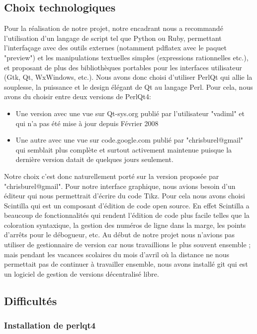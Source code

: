 \documentclass[a4paper]{report}
\begin{document}
  \subsection{Choix technologiques}
  Pour la réalisation de notre projet, notre encadrant nous a recommandé l'utilisation d'un langage de script tel que Python ou Ruby, permettant l'interfaçage avec des outils externes (notamment pdflatex avec le paquet "preview") et les manipulations textuelles simples (expressions rationnelles etc.), et proposant de plus des bibliothèques portables pour les interfaces utilisateur (Gtk, Qt, WxWindows, etc.). Nous avons donc choisi d'utiliser PerlQt qui allie la souplesse, la puissance et le design élégant de Qt au langage Perl. Pour cela, nous avons du choisir entre deux versions de PerlQt4:
\begin{itemize}
 \item Une version avec une vue sur Qt-sys.org publié par l'utilisateur "vadiml" et qui n'a pas été mise à jour depuis Février 2008
 \item Une autre avec une vue sur code.google.com publié par "chrisburel@gmail" qui semblait plus complète et surtout activement maintenue puisque la dernière version datait de quelques jours seulement.
\end{itemize}
  Notre choix c'est donc naturellement porté sur la version proposée par "chrisburel@gmail".
  \newline 
  Pour notre interface graphique, nous avions besoin d'un éditeur qui nous permettrait d'écrire du code Tikz. Pour cela nous avons choisi Scintilla qui est un composant d'édition de code open source. En effet Scintilla a beaucoup de fonctionnalités qui rendent l'édition de code plus facile telles que la coloration syntaxique, la gestion des numéros de ligne dans la marge, les points d'arrêts pour le débogueur, etc.
  \newline
  Au début de notre projet nous n'avions pas utiliser de gestionnaire de version car nous travaillions le plus souvent ensemble ; mais pendant les vacances scolaires du mois d'avril où la distance ne nous permettait pas de continuer à travailler ensemble, nous avons installé git qui est un logiciel de gestion de versions décentralisé libre. 
  \subsection{Difficultés}
  
\subsubsection{Installation de perlqt4}
\end{document}

